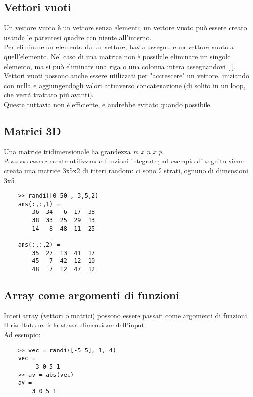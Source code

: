 \documentclass[a4paper, 10pt]{article}
\begin{document}
\subsection{Vettori vuoti}
Un vettore vuoto è un vettore senza elementi; un vettore vuoto può essere creato usando le parentesi quadre con niente all'interno. \\
Per eliminare un elemento da un vettore, basta assegnare un vettore vuoto a quell'elemento.  Nel caso di una matrice non è possibile eliminare un singolo elemento, ma si può eliminare una riga o una colonna intera assegnandovi [ ].\\
Vettori vuoti possono anche essere utilizzati per "accrescere" un vettore, iniziando con nulla e aggiungendogli valori attraverso concatenazione (di solito in un loop, che verrà trattato più avanti). \\
Questo tuttavia non è efficiente, e andrebbe evitato quando possibile.

\subsection{Matrici 3D}
Una matrice tridimensionale ha grandezza \textit{m x n x p}.\\
Possono essere create utilizzando funzioni integrate; ad esempio di seguito viene creata una matrice 3x5x2 di interi random: ci sono 2 strati, ognuno di dimensioni 3x5

\begin{lstlisting}
	>> randi([0 50], 3,5,2)
	ans(:,:,1) =
		36  34   6  17  38
		38  33  25  29  13
		14   8  48  11  25
		
	ans(:,:,2) =
		35  27  13  41  17
		45   7  42  12  10
		48   7  12  47  12
\end{lstlisting}

\subsection{Array come argomenti di funzioni}
Interi array (vettori o matrici) possono essere passati come argomenti di funzioni. Il risultato avrà la stessa dimensione dell'input.\\
Ad esempio:

\begin{lstlisting}
	>> vec = randi([-5 5], 1, 4)
	vec =
		-3 0 5 1
	>> av = abs(vec)
	av =
		3 0 5 1
\end{lstlisting}
\end{document}
